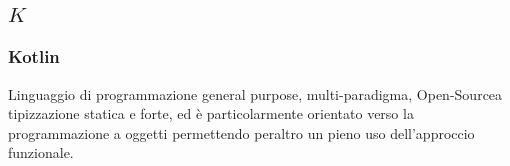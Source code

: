 \subsection*{\quad$K\quad$}
\subsubsection*{Kotlin}
Linguaggio di programmazione general purpose, multi-paradigma, Open-Source\glosp a tipizzazione statica e forte, ed è particolarmente orientato verso la programmazione a oggetti permettendo peraltro un pieno uso dell'approccio funzionale.